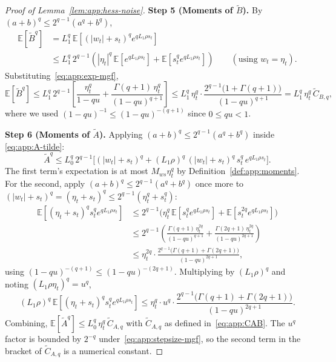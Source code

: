 \documentclass[10pt,a4paper]{amsart}
\begin{document}
\begin{proof}[Proof of Lemma~\ref{lem:app:hess-noise}]
\smallskip\noindent\textbf{Step 5 (Moments of $\widetilde B$).}
By $(a+b)^q \leq 2^{q-1}(a^q + b^q)$,
\begin{align*}
  \mathbb{E}[\widetilde B^q]
  &= L_1^q\, \mathbb{E}\!\left[(|w_t|+s_t)^q e^{qL_1\rho s_t}\right]
  \\
  &\leq L_1^q\, 2^{q-1}\!\left(|\eta_t|^q\, \mathbb{E}[e^{qL_1\rho s_t}]
      + \mathbb{E}[s_t^q e^{qL_1\rho s_t}]\right)
  \qquad (\text{using } w_t = \eta_t).
\end{align*}
Substituting~\eqref{eq:app:exp-mgf},
\[
  \mathbb{E}[\widetilde B^q]
  \leq L_1^q\, 2^{q-1}\!\left[\frac{\eta_t^q}{1-qu}
    + \frac{\Gamma(q+1)\, \eta_t^q}{(1-qu)^{q+1}}\right]
  \leq L_1^q\, \eta_t^q\cdot
    \frac{2^{q-1}\bigl(1 + \Gamma(q+1)\bigr)}{(1-qu)^{q+1}}
  = L_1^q\, \eta_t^q\, \widetilde C_{B,q},
\]
where we used $(1-qu)^{-1} \leq (1-qu)^{-(q+1)}$ since $0 \leq qu < 1$.

\smallskip\noindent\textbf{Step 6 (Moments of $\widetilde A$).}
Applying $(a+b)^q \leq 2^{q-1}(a^q + b^q)$ inside
\eqref{eq:app:A-tilde}:
\[
  \widetilde A^q
  \leq L_0^q\, 2^{q-1}\bigl[(|w_t|+s_t)^q
    + (L_1\rho)^q\, (|w_t|+s_t)^q\, s_t^q\, e^{qL_1\rho s_t}\bigr].
\]
The first term's expectation is at most $M_{ws}\eta_t^q$ by
Definition~\ref{def:app:moments}. For the second, apply $(a+b)^q \leq
2^{q-1}(a^q+b^q)$ once more to $(|w_t|+s_t)^q = (\eta_t + s_t)^q \leq
2^{q-1}(\eta_t^q + s_t^q)$:
\begin{align*}
  \mathbb{E}\!\left[(\eta_t + s_t)^q s_t^q e^{qL_1\rho s_t}\right]
  &\leq 2^{q-1}\bigl(\eta_t^q\, \mathbb{E}[s_t^q e^{qL_1\rho s_t}]
    + \mathbb{E}[s_t^{2q} e^{qL_1\rho s_t}]\bigr)
  \\
  &\leq 2^{q-1}\!\left(\frac{\Gamma(q+1)\,\eta_t^{2q}}{(1-qu)^{q+1}}
    + \frac{\Gamma(2q+1)\,\eta_t^{2q}}{(1-qu)^{2q+1}}\right)
  \\
  &\leq \eta_t^{2q}\cdot
    \frac{2^{q-1}\bigl(\Gamma(q+1) + \Gamma(2q+1)\bigr)}{(1-qu)^{2q+1}},
\end{align*}
using $(1-qu)^{-(q+1)} \leq (1-qu)^{-(2q+1)}$. Multiplying by $(L_1\rho)^q$
and noting $(L_1\rho\eta_t)^q = u^q$,
\[
  (L_1\rho)^q\, \mathbb{E}\!\left[(\eta_t + s_t)^q s_t^q e^{qL_1\rho s_t}\right]
  \leq \eta_t^q \cdot u^q \cdot
    \frac{2^{q-1}\bigl(\Gamma(q+1) + \Gamma(2q+1)\bigr)}{(1-qu)^{2q+1}}.
\]
Combining, $\mathbb{E}[\widetilde A^q] \leq L_0^q\, \eta_t^q\, \widetilde
C_{A,q}$ with $\widetilde C_{A,q}$ as defined in~\eqref{eq:app:CAB}. The
$u^q$ factor is bounded by $2^{-q}$ under~\eqref{eq:app:stepsize-mgf}, so
the second term in the bracket of $\widetilde C_{A,q}$ is a numerical
constant.


\end{proof}
\end{document}

